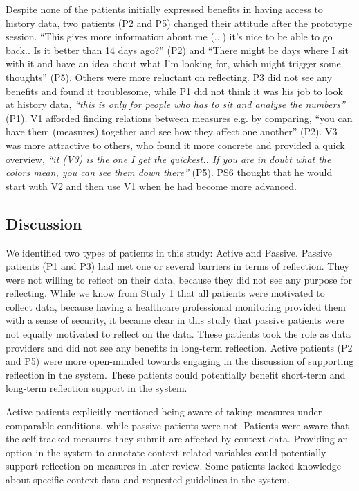 Despite none of the patients initially expressed benefits in having access to history data, two patients (P2 and P5) changed their attitude after the prototype session. “This gives more information about me (...) it’s nice to be able to go back.. Is it better than 14 days ago?” (P2) and “There might be days where I sit with it and have an idea about what I’m looking for, which might trigger some thoughts” (P5). Others were more reluctant on reflecting. P3 did not see any benefits and found it troublesome, while P1 did not think it was his job to look at history data, \textit{“this is only for people who has to sit and analyse the numbers”} (P1). V1 afforded finding relations between measures e.g. by comparing, “you can have them (measures) together and see how they affect one another” (P2). V3 was more attractive to others, who found it more concrete and provided a quick overview, \textit{“it (V3) is the one I get the quickest.. If you are in doubt what the colors mean, you can see them down there”} (P5). PS6 thought that he would start with V2 and then use V1 when he had become more advanced. 

\subsection{Discussion}
We identified two types of patients in this study: Active and Passive. Passive patients (P1 and P3) had met one or several barriers in terms of reflection. They were not willing to reflect on their data, because they did not see any purpose for reflecting. While we know from Study 1 that all patients were motivated to collect data, because having a healthcare professional monitoring provided them with a sense of security, it became clear in this study that passive patients were not equally motivated to reflect on the data. These patients took the role as data providers and did not see any benefits in long-term reflection. Active patients (P2 and P5) were more open-minded towards engaging in the discussion of supporting reflection in the system. These patients could potentially benefit short-term and long-term reflection support in the system.

Active patients explicitly mentioned being aware of taking measures under comparable conditions, while passive patients were not. Patients were aware that the self-tracked measures they submit are affected by context data. Providing an option in the system to annotate context-related variables could potentially support reflection on measures in later review. Some patients lacked knowledge about specific context data and requested guidelines in the system. 

